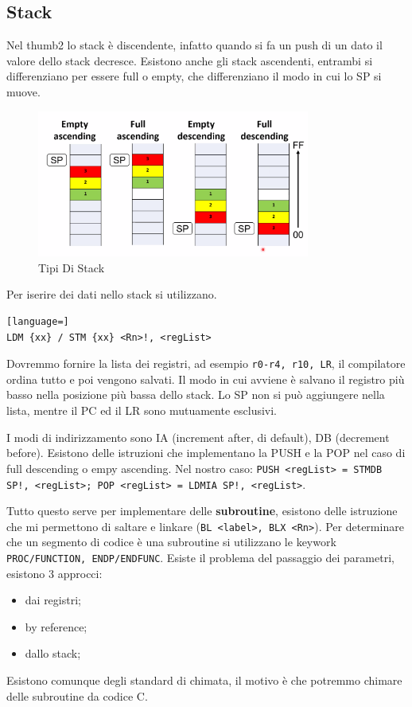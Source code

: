 \documentclass[12pt]{article}
\begin{document}
\subsection{Stack}
Nel thumb2 lo stack \`e discendente, infatto quando si fa un push di un dato il valore dello stack decresce. Esistono anche gli stack ascendenti, entrambi si differenziano per essere full o empty,
che differenziano il modo in cui lo SP si muove.
\begin{figure}[H]
    \centering
    \includegraphics[width=0.8\textwidth]{tipi-di-stack.png}
    \caption{Tipi Di Stack}
    \label{fig:tipi-di-stack}
\end{figure}
Per iserire dei dati nello stack si utilizzano.
\begin{lstlisting}[language=]
LDM {xx} / STM {xx} <Rn>!, <regList>
\end{lstlisting}
Dovremmo fornire la lista dei registri, ad esempio \texttt{r0-r4, r10, LR}, il compilatore ordina tutto e poi vengono salvati. Il modo in cui avviene \`e salvano il registro pi\`u basso nella posizione pi\`u bassa dello stack. Lo SP non si pu\`o aggiungere nella lista, mentre il PC ed il LR sono mutuamente esclusivi.

I modi di indirizzamento sono IA (increment after, di default), DB (decrement before). Esistono delle istruzioni che implementano la PUSH e la POP nel caso di full descending o empy ascending. Nel nostro caso: \texttt{PUSH <regList> = STMDB SP!, <regList>; POP <regList> = LDMIA SP!, <regList>}.

Tutto questo serve per implementare delle \textbf{subroutine}, esistono delle istruzione che mi permettono di saltare e linkare (\texttt{BL <label>, BLX <Rn>}). Per determinare che un segmento di codice \`e una subroutine si utilizzano le keywork \texttt{PROC/FUNCTION, ENDP/ENDFUNC}. Esiste il problema del passaggio dei parametri, esistono 3 approcci:
\begin{itemize}
    \item dai registri;
    \item by reference;
    \item dallo stack;
\end{itemize}
Esistono comunque degli standard di chimata, il motivo \`e che potremmo chimare delle subroutine da codice C.
\end{document}
